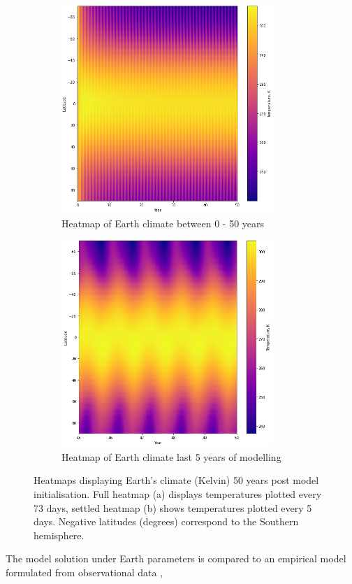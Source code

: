 \documentclass[12pt,onecolumn]{revtex4-2}    %
\begin{document}
\begin{figure}
\begin{subfigure}{.5\textwidth}
  \centering
  \includegraphics[width = 8cm]{Earth50yrsHeatmap.png}
  \caption{Heatmap of Earth climate between 0 - 50 years}
  \label{fig:sub1}
\end{subfigure}%
\begin{subfigure}{.5\textwidth}
  \centering
  \includegraphics[width=8cm]{Earth5yrsHeatmap.png}
  \caption{Heatmap of Earth climate last 5 years of modelling}
  \label{fig:sub2}
\end{subfigure}
\raggedright
\caption{Heatmaps displaying Earth's climate (Kelvin) 50 years post model initialisation. Full heatmap (a) displays temperatures plotted every 73 days, settled heatmap (b) shows temperatures plotted every 5 days. Negative latitudes (degrees) correspond to the Southern hemisphere.}
\label{fig:test}
\end{figure}

The model solution under Earth parameters is compared to an empirical model formulated from observational data \cite{NC79},
\end{document}
